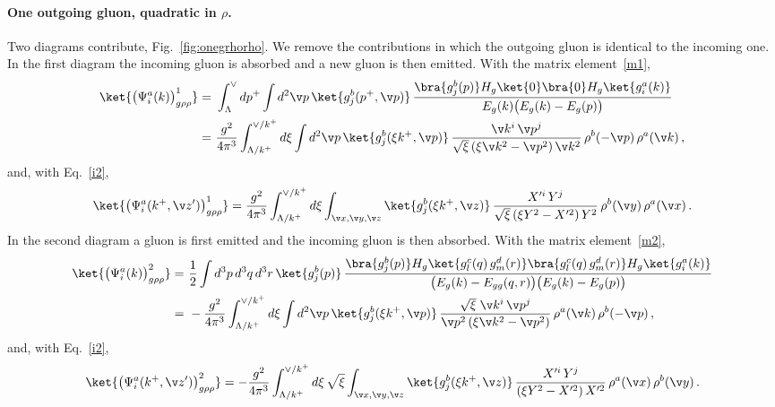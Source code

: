 \paragraph{One outgoing gluon, quadratic in $\rho$.}
Two diagrams contribute, Fig.~\ref{fig:onegrhorho}. We remove the contributions in which the outgoing
gluon is identical to the incoming one. In the first diagram the incoming gluon is absorbed and a new
gluon is then emitted. With the matrix element~\eqref{m1},
\begin{align}\label{m1grr}
\ket{\big(\Psi^{a}_{i}(k)\big)^{1}_{g\rho\rho}}
=\ &\int_{\Lambda}^{\vee}dp^{+}\int d^{2}\v p\,\ket{g^{b}_{j}(p^{+},\v p)}\,
\frac{\bra{g^{b}_{j}(p)}H_{g}\ket{0}\bra{0}H_{g}\ket{g^{a}_{i}(k)}}{E_{g}(k)\big(E_{g}(k)-E_{g}(p)\big)}\notag\\
=\ &\frac{g^{2}}{4\pi^{3}}\int_{\Lambda/k^{+}}^{\vee/k^{+}}d\xi\int d^{2}\v p\,\ket{g^{b}_{j}(\xi k^{+},\v p)}\,
\frac{\v k^{i}\,\v p^{j}}{\sqrt{\xi}\,(\xi\v k^{2}-\v p^{2})\,\v k^{2}}\,\rho^{b}(-\v p)\,\rho^{a}(\v k)\,,
\end{align}
and, with Eq.~\eqref{i2},
\begin{align}\label{m1grrX}
\ket{\big(\Psi^{a}_{i}(k^{+},\v z')\big)^{1}_{g\rho\rho}}
=\frac{g^{2}}{4\pi^{3}}\int_{\Lambda/k^{+}}^{\vee/k^{+}}d\xi\int_{\v x,\v y,\v z}\ket{g^{b}_{j}(\xi k^{+},\v z)}\,
\frac{X'^{i}\,Y^{j}}{\sqrt{\xi}\,(\xi Y^{2}-X'^{2})\,Y^{2}}\,\rho^{b}(\v y)\,\rho^{a}(\v x)\,.
\end{align}
In the second diagram a gluon is first emitted and the incoming gluon is then absorbed. With the matrix
element~\eqref{m2},
\begin{align}\label{m2grr}
\ket{\big(\Psi^{a}_{i}(k)\big)^{2}_{g\rho\rho}}
=\ &\frac{1}{2}\int d^{3}p\,d^{3}q\,d^{3}r\,\ket{g^{b}_{j}(p)}\,
\frac{\bra{g^{b}_{j}(p)}H_{g}\ket{g^{c}_{l}(q)\,g^{d}_{m}(r)}\bra{g^{c}_{l}(q)\,g^{d}_{m}(r)}H_{g}\ket{g^{a}_{i}(k)}}
{\big(E_{g}(k)-E_{gg}(q,r)\big)\big(E_{g}(k)-E_{g}(p)\big)}\notag\\
=\ &-\frac{g^{2}}{4\pi^{3}}\int_{\Lambda/k^{+}}^{\vee/k^{+}}d\xi\int d^{2}\v p\,\ket{g^{b}_{j}(\xi k^{+},\v p)}\,
\frac{\sqrt{\xi}\;\v k^{i}\,\v p^{j}}{\v p^{2}\,(\xi\v k^{2}-\v p^{2})}\,\rho^{a}(\v k)\,\rho^{b}(-\v p)\,,
\end{align}
and, with Eq.~\eqref{i2},
\begin{align}\label{m2grrX}
\ket{\big(\Psi^{a}_{i}(k^{+},\v z')\big)^{2}_{g\rho\rho}}
=-\frac{g^{2}}{4\pi^{3}}\int_{\Lambda/k^{+}}^{\vee/k^{+}}d\xi\,\sqrt{\xi}\int_{\v x,\v y,\v z}\ket{g^{b}_{j}(\xi k^{+},\v z)}\,
\frac{X'^{i}\,Y^{j}}{(\xi Y^{2}-X'^{2})\,X'^{2}}\,\rho^{a}(\v x)\,\rho^{b}(\v y)\,.
\end{align}
